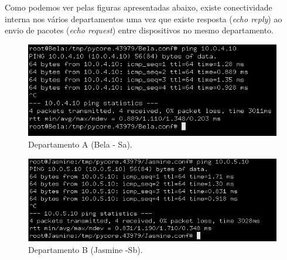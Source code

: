     \par Como podemos ver pelas figuras apresentadas abaixo, existe conectividade interna nos vários departamentos uma vez que existe resposta (\textit{echo reply}) ao envio de pacotes (\textit{echo request}) entre dispositivos no mesmo departamento.
    
    \begin{minipage}{0.5\linewidth}
    \centering
        \begin{figure}[H]
        \includegraphics[width=\linewidth]{images/ParteII/Questao1/parteII-questao1-d-Bela.jpg}
        \caption{Departamento A (Bela - Sa).} \label{parteII-questao1-ping-Bela-SA}
        \end{figure}
    \end{minipage}
    \begin{minipage}{0.5\linewidth}
    \centering
        \begin{figure}[H]
        \includegraphics[width=\linewidth]{images/ParteII/Questao1/parteII-questao1-d-Jasmine.jpg}
        \caption{Departamento B (Jasmine -Sb).} \label{parteII-questao1-ping-Jamsmine-SB}
        \end{figure}
    \end{minipage}
    
